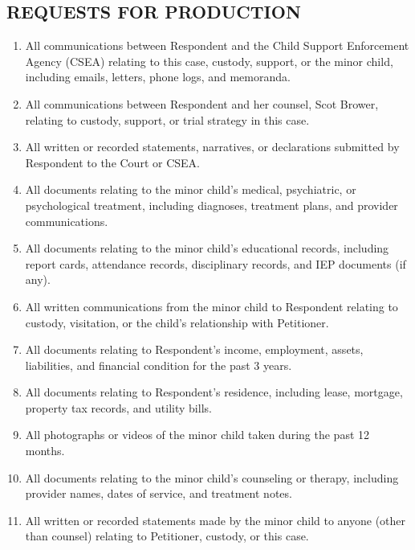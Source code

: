\documentclass[11pt,letter]{article}
\begin{document}
\subsection*{REQUESTS FOR PRODUCTION}

\begin{enumerate}
\item All communications between Respondent and the Child Support Enforcement Agency (CSEA) relating to this case, custody, support, or the minor child, including emails, letters, phone logs, and memoranda.

\item All communications between Respondent and her counsel, Scot Brower, relating to custody, support, or trial strategy in this case.

\item All written or recorded statements, narratives, or declarations submitted by Respondent to the Court or CSEA.

\item All documents relating to the minor child's medical, psychiatric, or psychological treatment, including diagnoses, treatment plans, and provider communications.

\item All documents relating to the minor child's educational records, including report cards, attendance records, disciplinary records, and IEP documents (if any).

\item All written communications from the minor child to Respondent relating to custody, visitation, or the child's relationship with Petitioner.

\item All documents relating to Respondent's income, employment, assets, liabilities, and financial condition for the past 3 years.

\item All documents relating to Respondent's residence, including lease, mortgage, property tax records, and utility bills.

\item All photographs or videos of the minor child taken during the past 12 months.

\item All documents relating to the minor child's counseling or therapy, including provider names, dates of service, and treatment notes.

\item All written or recorded statements made by the minor child to anyone (other than counsel) relating to Petitioner, custody, or this case.


\end{enumerate}
\end{document}
